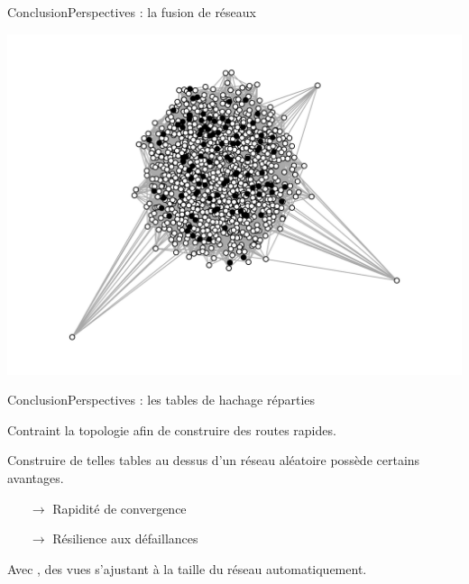 \begin{frame}{Conclusion}{Perspectives : la fusion de réseaux}
\begin{minipage}{0.325\textwidth}
    \includegraphics[width=1.2\textwidth]{img/graphC.png}
  \end{minipage}

\end{frame}

\begin{frame}{Conclusion}{Perspectives : les tables de hachage réparties}


  Contraint la topologie afin de construire des routes rapides.

  \vspace{0.25cm}


  \begin{center}
    
  \end{center}

  \vspace{0.25cm}

  Construire de telles tables au dessus d'un réseau aléatoire possède certains 
  avantages.
  \begin{itemize}
  \item [$\rightarrow$] Rapidité de convergence
  \item [$\rightarrow$] Résilience aux défaillances
  \end{itemize}

  \vspace{0.25cm}

  Avec \SPRAY, des vues s'ajustant à la taille du réseau automatiquement.


\end{frame}

